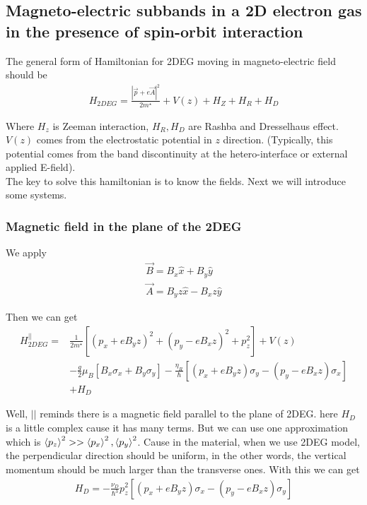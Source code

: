  
 \subsection{Magneto-electric subbands in a 2D electron gas in the presence of spin-orbit interaction}
 \label{sec: 2D subbands}
 
 The general form of Hamiltonian for 2DEG moving in magneto-electric field should be
\begin{align}
	H_{2DEG}=\frac{|\vec{p}+e\vec{A}|^2}{2m^\star}+V(z)+H_Z+H_R+H_D	
	\label{equ: general form hamiltonian of subbands}
\end{align}

Where $H_z$ is Zeeman interaction, $H_R,H_D$ are Rashba and Dresselhaus effect. $V(z)$ comes from the electrostatic potential in $z$ direction. (Typically, this potential comes from the band discontinuity at the hetero-interface or external applied E-field).\\

The key to solve this hamiltonian is to know the fields. Next we will introduce some systems.

\subsubsection{Magnetic field in the plane of the 2DEG}
\label{sec: magnetic field in the plane of 2deg for subbands}

We apply
\begin{gather*}
	\vec{B}=B_x\hat{x}+B_y\hat{y}\\
	\vec{A}=B_yz\hat{x}-B_xz\hat{y}
\end{gather*}

Then we can get 
\begin{align}
	H^{||}_{2DEG}=&\frac{1}{2m^\star}[(p_x+eB_yz)^2+(p_y-eB_xz)^2+p_z^2]+V(z)\\
	\nonumber&-\frac{g}{2}\mu_B[B_x\sigma_x+B_y\sigma_y]-\frac{\eta_R}{\hbar}[(p_x+eB_yz)\sigma_y-(p_y-eB_xz)\sigma_x]\\
	\nonumber&+H_D
	\label{equ: hamiltonian of in plane magnetic field of subbands}
\end{align}

Well, $||$ reminds there is a magnetic field parallel to the plane of 2DEG. here $H_D$ is a little complex cause it has many terms. But we can use one approximation which is $\braket{p_z}^2 >> \braket{p_x}^2, \braket{p_y}^2$. Cause in the material, when we use 2DEG model, the perpendicular direction should be uniform, in the other words, the vertical momentum should be much larger than the transverse ones. With this we can get 
\begin{align*}
	H_D=-\frac{\nu_D}{\hbar^3}p_z^2[(p_x+eB_yz)\sigma_x-(p_y-eB_xz)\sigma_y]
\end{align*}

